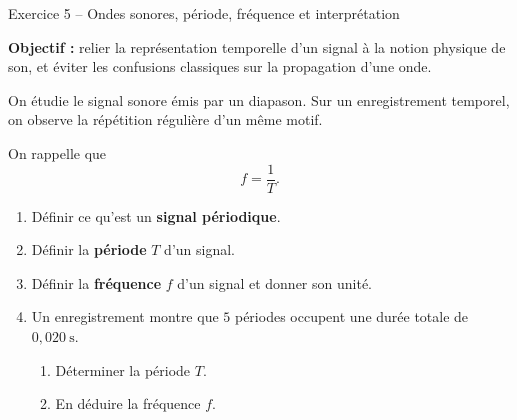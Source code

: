 \documentclass[11pt,a4paper]{article}
\begin{document}
\begin{exobox}{Exercice 5 -- Ondes sonores, période, fréquence et interprétation}
\begin{objectifbox}
\textbf{Objectif :} relier la représentation temporelle d’un signal à la notion physique de son, et éviter les confusions classiques sur la propagation d’une onde.
\end{objectifbox}

On étudie le signal sonore émis par un diapason. Sur un enregistrement temporel, on observe la répétition régulière d’un même motif.

\begin{center}
\end{center}

On rappelle que
\[
f=\frac{1}{T}.
\]

\begin{enumerate}[label=\textbf{\arabic*.}]
    \item Définir ce qu’est un \textbf{signal périodique}.

    \item Définir la \textbf{période} \(T\) d’un signal.

    \item Définir la \textbf{fréquence} \(f\) d’un signal et donner son unité.

    \item Un enregistrement montre que \(5\) périodes occupent une durée totale de \(0{,}020~\mathrm{s}\).
    \begin{enumerate}[label=\alph*)]
        \item Déterminer la période \(T\).
        \item En déduire la fréquence \(f\).
    \end{enumerate}


\end{enumerate}
\end{exobox}
\end{document}
